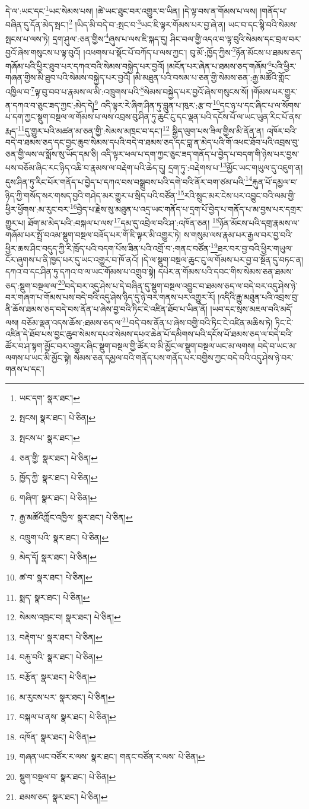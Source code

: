 དེ་ལ་:ཡང་དང་\footnote{ཡང་དག་  སྣར་ཐང་། }ཡང་སེམས་པས། །ཚེ་ཡང་ཐུང་བར་འགྱུར་བ་ཡིན། །དེ་ལྟ་བས་ན་གོམས་པ་ལས། །གནོད་པ་བཞིན་དུ་དོན་མེད་སྤང་།\footnote{སྤངས།  སྣར་ཐང་།  པེ་ཅིན། } །ཡིད་མི་བདེ་བ་:སྤང་བ་\footnote{སྤངས་པ་  སྣར་ཐང་། }ཡང་ཇི་ལྟར་གོམས་པར་བྱ་ཞེ་ན། ཡང་བ་དང་སྙི་བའི་སེམས་སྤངས་པ་ལས་ཏེ། དྲག་ཤུལ་:ཅན་གྱིས་\footnote{ཅན་གྱི་  སྣར་ཐང་།  པེ་ཅིན། }ཞུས་པ་ལས་ཇི་སྐད་དུ། ཤིང་བལ་གྱི་འདའ་བ་ལྟ་བུའི་སེམས་དང་བྲལ་བར་བྱའོ་ཞེས་གསུངས་པ་ལྟ་བུའོ། །འཕགས་པ་སྡོང་པོ་བཀོད་པ་ལས་ཀྱང་། བུ་མོ་:ཁྱོད་ཀྱིས་\footnote{ཁྱོད་ཀྱི་  སྣར་ཐང་།  པེ་ཅིན། }ཉོན་མོངས་པ་ཐམས་ཅད་གཞོམ་པའི་ཕྱིར་ཐུབ་པར་དཀའ་བའི་སེམས་བསྐྱེད་པར་བྱའོ། །མངོན་པར་ཞེན་པ་ཐམས་ཅད་གཞོམ་\footnote{གཞིག་  སྣར་ཐང་།  པེ་ཅིན། }པའི་ཕྱིར་གཞན་གྱིས་མི་ཐུབ་པའི་སེམས་བསྐྱེད་པར་བྱའོ། །མི་མཐུན་པའི་བསམ་པ་ཅན་གྱི་སེམས་ཅན་:རྒྱ་མཚོའི་གློང་འཁྱིལ་བ་\footnote{རྒྱ་མཚོའིཀློང་འཁྱིལ་  སྣར་ཐང་།  པེ་ཅིན། }ལྟ་བུ་བབ་པ་རྣམས་ལ་མི་:འཁྲུགས་པའི་\footnote{འཁྲུག་པའི་  སྣར་ཐང་།  པེ་ཅིན། }སེམས་བསྐྱེད་པར་བྱའོ་ཞེས་གསུངས་སོ། །གོམས་པར་གྱུར་ན་དཀའ་བ་ཅུང་ཟད་ཀྱང་:མེད་དེ།\footnote{མེད་དོ།  སྣར་ཐང་།  པེ་ཅིན། } འདི་ལྟར་རེ་ཞིག་ཤིན་ཏུ་བླུན་པ་ཁུར་:རྩ་བ་\footnote{ཚ་བ་  སྣར་ཐང་།  པེ་ཅིན། }དང་ཉ་པ་དང་ཞིང་པ་ལ་སོགས་པ་དག་ཀྱང་སྡུག་བསྔལ་ལ་གོམས་པ་ལས་འབྲས་བུ་ཤིན་ཏུ་ཆུང་ངུ་དང་ལྡན་པའི་དངོས་པོ་ལ་ཡང་ཡུན་རིང་པོ་ནས་རྨད་\footnote{སྨད་  སྣར་ཐང་།  པེ་ཅིན། }དུ་གྱུར་པའི་མཚན་མ་ཅན་གྱི་:སེམས་མཁྲང་བ་དང་།\footnote{སེམས་འཁྲང་བ།  སྣར་ཐང་།  པེ་ཅིན། } སྒྱིད་ལུག་པས་ཟིལ་གྱིས་མི་ནོན་ན། འཁོར་བའི་བདེ་བ་ཐམས་ཅད་དང་བྱང་ཆུབ་སེམས་དཔའི་བདེ་བ་ཐམས་ཅད་དང་བླ་ན་མེད་པའི་གོ་འཕང་ཐོབ་པའི་འབྲས་བུ་ཅན་གྱི་ལས་ལ་སྨོས་སུ་ཡོད་དམ་ཅི། འདི་ལྟར་ཕལ་པ་དག་ཀྱང་ཅུང་ཟད་གནོད་པ་བྱེད་པ་བདག་གི་ཉེས་པར་བྱས་པས་བཅོམ་ཞིང་རང་ཉིད་འཆི་བ་རྣམས་ལ་བརྡེག་པའི་ཆེད་དུ། དྲག་ཏུ་:བརྡེགས་པ་\footnote{བརྡེག་པ་  སྣར་ཐང་།  པེ་ཅིན། }མྱོང་ཡང་གཡུལ་དུ་འཇུག་ན། དུས་ཤིན་ཏུ་རིང་པོར་གནོད་པ་བྱེད་པ་དཀའ་བས་བསྒྲུབས་པའི་དགེ་བའི་ནོར་བག་ཙམ་པའི་\footnote{བརྐུ་བའི་  སྣར་ཐང་།  པེ་ཅིན། }རྐུན་པོ་དམྱལ་བ་ཉིད་ཀྱི་གསོད་སར་གསད་བྱའི་གཤེད་མར་གྱུར་པ་སྲིད་པའི་བཙོན་\footnote{བརྩོན་  སྣར་ཐང་།  པེ་ཅིན། }རའི་སྲུང་མར་ངེས་པར་འབྱུང་བའི་ལམ་གྱི་ཕྱིར་ཕྱོགས་:མ་རུང་བར་\footnote{མ་རུངས་པར་  སྣར་ཐང་།  པེ་ཅིན། }བྱེད་པ་རྗེས་སུ་མཐུན་པ་འདྲ་ཡང་གནོད་པ་དྲག་པོ་བྱེད་པ་གནོད་པ་མ་བྱས་པར་དགྲར་གྱུར་པ། ཐོག་མ་མེད་པའི་:བསྐལ་པ་ལས་\footnote{བསྐལ་པ་ནས་  སྣར་ཐང་།  པེ་ཅིན། }དམ་དུ་འབྲེལ་བའི་ཤ་:འཁོན་ཅན། \footnote{འཁོན་  སྣར་ཐང་།  པེ་ཅིན། }ཉོན་མོངས་པའི་དགྲ་རྣམས་ལ་གཞོམ་པར་སྤྲོ་བའམ་སྡུག་བསྔལ་བཟོད་པར་གོ་ཇི་ལྟར་མི་འགྱུར་ཏེ། ས་གསུམ་ལས་རྣམ་པར་རྒྱལ་བར་བྱ་བའི་ཕྱིར་ཆས་ཤིང་བདུད་ཀྱི་རི་ཁྲོད་པའི་བདག་པོས་ཟིན་པའི་འགྲོ་བ་:གནང་བཙོན་\footnote{གཞན་ཡང་བཙོར་ར་ལས་  སྣར་ཐང་། གནང་བཙོན་ར་ལས་  པེ་ཅིན། }ཐར་བར་བྱ་བའི་ཕྱིར་གཡུལ་ངོར་ཞུགས་པ་ནི་ཁྱད་པར་དུ་ཡང་འགྱུར་བ་ཁོ་ནའོ། །དེ་ལ་སྡུག་བསྔལ་ཆུང་ངུ་ལ་གོམས་པར་བྱ་བ་སྔོན་དུ་བཏང་ན། དཀའ་བ་དང་ཤིན་ཏུ་དཀའ་བ་ལ་ཡང་གོམས་པ་འགྲུབ་སྟེ། དཔེར་ན་གོམས་པའི་དབང་གིས་སེམས་ཅན་ཐམས་ཅད་:སྡུག་བསྔལ་ལ་\footnote{སྡུག་བསྔལ་བ་  སྣར་ཐང་།  པེ་ཅིན། }བདེ་བར་འདུ་ཤེས་པ་དེ་བཞིན་དུ་སྡུག་བསྔལ་འབྱུང་བ་ཐམས་ཅད་ལ་བདེ་བར་འདུ་ཤེས་ཉེ་བར་གཞག་པ་གོམས་པས་བདེ་བའི་འདུ་ཤེས་ཉིད་དུ་ཉེ་བར་གནས་པར་འགྱུར་རོ། །འདིའི་རྒྱུ་མཐུན་པའི་འབྲས་བུ་ནི་ཆོས་ཐམས་ཅད་བདེ་བས་ནོན་པ་ཞེས་བྱ་བའི་ཏིང་ངེ་འཛིན་ཐོབ་པ་ཡིན་ནོ། །ཡབ་དང་སྲས་མཇལ་བའི་མདོ་ལས། བཅོམ་ལྡན་འདས་ཆོས་:ཐམས་ཅད་ལ་\footnote{ཐམས་ཅད་  སྣར་ཐང་།  པེ་ཅིན། }བདེ་བས་ནོན་པ་ཞེས་བགྱི་བའི་ཏིང་ངེ་འཛིན་མཆིས་ཏེ། ཏིང་ངེ་འཛིན་དེ་ཐོབ་པས་བྱང་ཆུབ་སེམས་དཔའ་སེམས་དཔའ་ཆེན་པོ་དམིགས་པའི་དངོས་པོ་ཐམས་ཅད་ལ་བདེ་བའི་ཚོར་བ་ཤ་སྟག་མྱོང་བར་འགྱུར་ཞིང་སྡུག་བསྔལ་གྱི་ཚོར་བ་མི་མྱོང་ལ་སྡུག་བསྔལ་ཡང་མ་ལགས། བདེ་བ་ཡང་མ་ལགས་པ་ཡང་མི་མྱོང་སྟེ། སེམས་ཅན་དམྱལ་བའི་གནོད་པས་གནོད་པར་བགྱིས་ཀྱང་བདེ་བའི་འདུ་ཤེས་ཉེ་བར་གནས་པ་དང་། 